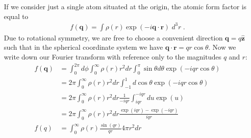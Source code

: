\documentclass[11pt]{article}
\renewcommand{\vec}[1]{\boldsymbol{#1}}
\newcommand{\hvec}[1]{\hat{\vec{#1}}}
\begin{document}
If we consider just a single atom situated at the origin, the atomic form factor is equal to
\begin{align}
 f(\vec{q})  = \int \rho(r) \exp(-i \vec{q}\cdot\vec{r}) \; d^3r \; .
\end{align}
Due to rotational symmetry, we are free to choose a convenient direction $\vec{q} = q \hvec{z}$ such that in the spherical coordinate system we have $\vec{q}\cdot\vec{r} =  q r \cos\theta$.  Now we write down our Fourier transform with reference only to the magnitudes $q$ and $r$:
\begin{align}
f(\vec{q})  &= \int_0^{2\pi} d\phi \int_0^\infty \rho(r) r^2 dr \int_0^\pi \sin\theta d\theta  \exp(-i q r \cos\theta)  \\
&=2\pi \int_0^\infty \rho(r) r^2 dr \int_{-1}^1  d\cos\theta  \exp(-i q r \cos\theta)  \\
&=2\pi \int_0^\infty \rho(r) r^2 dr \frac{1}{-iqr}\int_{iqr}^{-iqr}  du  \exp(u)  \\
&=2\pi \int_0^\infty \rho(r) r^2 dr \frac{\exp(iqr) - \exp(-iqr)}{iqr}   \\
f(q) &= \int_0^\infty \rho(r)   \frac{\sin(qr)}{qr}  4\pi r^2 dr  
\end{align}


\newpage






\end{document}
